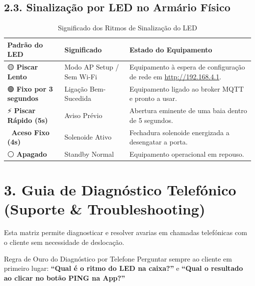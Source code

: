 \documentclass[11pt,a4paper]{article}
\begin{document}
\subsection*{2.3. Sinalização por LED no Armário Físico}

\begin{table}[h!]
\centering
\small
\renewcommand{\arraystretch}{1.25}
\begin{tabular}{@{}p{3.5cm}p{4.5cm}p{8.2cm}@{}}
\toprule
\textbf{Padrão do LED} & \textbf{Significado} & \textbf{Estado do Equipamento} \\ \midrule
🟡 \textbf{Piscar Lento} & Modo AP Setup / Sem Wi-Fi & Equipamento à espera de configuração de rede em \url{http://192.168.4.1}. \\
🟢 \textbf{Fixo por 3 segundos} & Ligação Bem-Sucedida & Equipamento ligado ao broker MQTT e pronto a usar. \\
⚡ \textbf{Piscar Rápido (5s)} & Aviso Prévio & Abertura eminente de uma baia dentro de 5 segundos. \\
🔴 \textbf{Aceso Fixo (4s)} & Solenoide Ativo & Fechadura solenoide energizada a desengatar a porta. \\
⚪ \textbf{Apagado} & Standby Normal & Equipamento operacional em repouso. \\ \bottomrule
\end{tabular}
\caption{Significado dos Ritmos de Sinalização do LED}
\end{table}

\vspace{0.4cm}

\section*{\textcolor{gallopblue}{3. Guia de Diagnóstico Telefónico (Suporte \& Troubleshooting)}}

Esta matriz permite diagnosticar e resolver avarias em chamadas telefónicas com o cliente sem necessidade de deslocação.

\begin{alertBox}{Regra de Ouro do Diagnóstico por Telefone}
Perguntar sempre ao cliente em primeiro lugar: \textbf{``Qual é o ritmo do LED na caixa?''} e \textbf{``Qual o resultado ao clicar no botão PING na App?''}
\end{alertBox}
\end{document}

